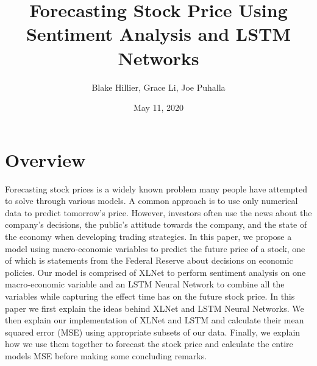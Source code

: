 \documentclass{article}
\title{Forecasting Stock Price Using Sentiment Analysis and LSTM Networks}
\author{Blake Hillier, Grace Li, Joe Puhalla}
\date{May 11, 2020}
\begin{document}
\maketitle

\section{Overview}
Forecasting stock prices is a widely known problem many people have attempted to solve through various models. A common approach is to use only numerical data to predict tomorrow's price. However, investors often use the news about the company's decisions, the public's attitude towards the company, and the state of the economy when developing trading strategies. In this paper, we propose a model using macro-economic variables to predict the future price of a stock, one of which is statements from the Federal Reserve about decisions on economic policies. Our model is comprised of XLNet to perform sentiment analysis on one macro-economic variable and an LSTM Neural Network to combine all the variables while capturing the effect time has on the future stock price. In this paper we first explain the ideas behind XLNet and LSTM Neural Networks. We then explain our implementation of XLNet and LSTM and calculate their mean squared error (MSE) using appropriate subsets of our data. Finally, we explain how we use them together to forecast the stock price and calculate the entire models MSE before making some concluding remarks.
\end{document}
